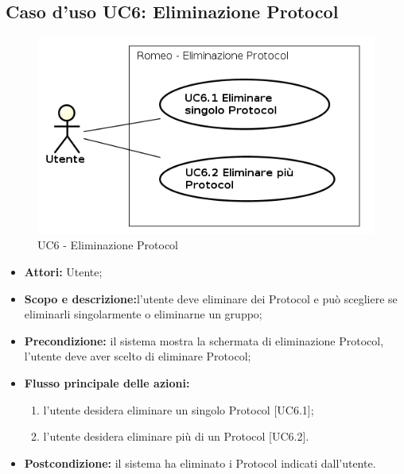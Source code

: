 \subsection{Caso d'uso UC6: Eliminazione Protocol}
\begin{figure}[!h]
\begin{center}
\includegraphics[scale=0.6]{./img/Use_Case/UC6}
\caption{UC6 - Eliminazione Protocol}
\end{center}
\end{figure}
\begin{itemize}
\item \textbf{Attori:} Utente;
\item \textbf{Scopo e descrizione:}l'utente deve eliminare dei Protocol\glossario{} e può scegliere se eliminarli singolarmente o eliminarne un gruppo;
\item \textbf{Precondizione:} il sistema mostra la schermata di eliminazione Protocol\glossario{}, l'utente deve aver scelto di eliminare Protocol\glossario{};
\item \textbf{Flusso principale delle azioni:}
\begin{enumerate}
\item l'utente desidera eliminare un singolo Protocol\glossario{} [UC6.1];
\item l'utente desidera eliminare più di un Protocol\glossario{} [UC6.2].
\end{enumerate}
\item \textbf{Postcondizione:} il sistema ha eliminato i Protocol\glossario{} indicati dall'utente.
\end{itemize}



